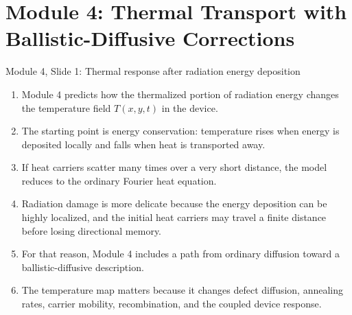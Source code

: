\documentclass[11pt]{article}
\begin{document}
\section{Module 4: Thermal Transport with Ballistic-Diffusive Corrections}

\begin{slidebox}{Module 4, Slide 1: Thermal response after radiation energy deposition}
\begin{enumerate}
\item Module 4 predicts how the thermalized portion of radiation energy changes the temperature field \(T(x,y,t)\) in the device.
\item The starting point is energy conservation: temperature rises when energy is deposited locally and falls when heat is transported away.
\item If heat carriers scatter many times over a very short distance, the model reduces to the ordinary Fourier heat equation.
\item Radiation damage is more delicate because the energy deposition can be highly localized, and the initial heat carriers may travel a finite distance before losing directional memory.
\item For that reason, Module 4 includes a path from ordinary diffusion toward a ballistic-diffusive description.
\item The temperature map matters because it changes defect diffusion, annealing rates, carrier mobility, recombination, and the coupled device response.
\end{enumerate}
\end{slidebox}
\end{document}
